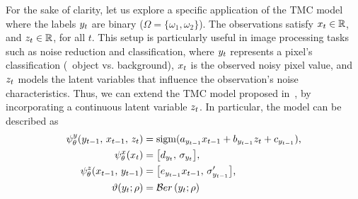\begin{example}

    For the sake of clarity, let us explore a specific application of the
    TMC model where the labels $y_t$ are binary ($\Omega=\{\omega_1,\omega_2 \}$).
    The observations satisfy $x_t \in \mathbb{R}$, and $z_t \in \mathbb{R}$, 
    for all $t$.
    This setup is particularly useful in image processing tasks such as 
     noise reduction and classification,
     where $y_t$ represents a pixel's classification (\eg~object vs. background),
     $x_t$ is the observed noisy pixel value, and $z_t$ models the latent
     variables that influence the observation's noise characteristics.
    Thus, we can extend the TMC model proposed in~\citep{pieczynski2005triplet},
     by incorporating a continuous latent variable $z_t$.
    In particular, the model can be described as
    \begin{align*}
        \py(\lab_{t-1},\, \obs_{t-1},\, \latent_t) &= 
        {\rm sigm}(a_{\lab_{t-1}} \obs_{t-1} + b_{\lab_{t-1}} \latent_t + c_{\lab_{t-1}})
        \text{,} \\
        \px(\obs_{t}) 
        &= \big[d_{\lab_{t}},\, \sigma_{\lab_{t}} \big] \text{,} \\
        \pz(\obs_{t-1},\, \lab_{t-1}) &=  
        \big[ e_{\lab_{t-1}}\obs_{t-1},\, \sigma_{\lab_{t-1}}'\big] 
        \text{,} \\
        \vartheta(\lab_t; \rho)&= \Ber\left(\lab_t; \rho \right) 

\end{align*}
\end{example}

